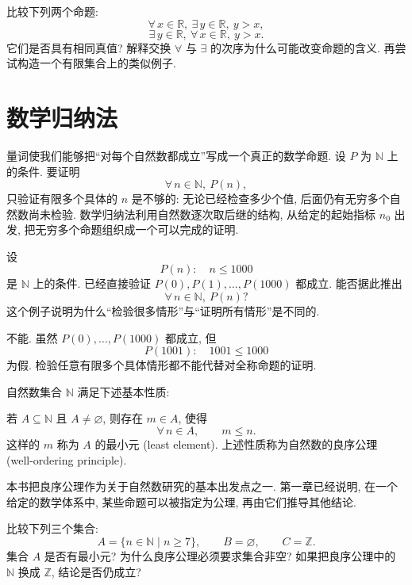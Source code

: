 \documentclass[usesamecnt, thmcnt=section, lang=cn, newtx, 10pt, scheme=chinese]{elegantbook}
\begin{document}
\begin{challenge}\label{ch:sets-03}
比较下列两个命题:
\[
 \forall\,x\in\mathbb R,\ \exists\,y\in\mathbb R,\ y>x,
\]
\[
 \exists\,y\in\mathbb R,\ \forall\,x\in\mathbb R,\ y>x.
\]
它们是否具有相同真值? 解释交换 $\forall$ 与 $\exists$ 的次序为什么可能改变命题的含义. 再尝试构造一个有限集合上的类似例子.
\end{challenge}


\section{数学归纳法}\label{sec:sets-induction}

量词使我们能够把``对每个自然数都成立''写成一个真正的数学命题. 设 $P$ 为 $\mathbb N$ 上的条件. 要证明
\[
 \forall\,n\in\mathbb N,\ P(n),
\]
只验证有限多个具体的 $n$ 是不够的: 无论已经检查多少个值, 后面仍有无穷多个自然数尚未检验. 数学归纳法利用自然数逐次取后继的结构, 从给定的起始指标 $n_0$ 出发, 把无穷多个命题组织成一个可以完成的证明.

\begin{concept}\label{con:sets-induction-finite}
设
\[
 P(n):\quad n\leq1000
\]
是 $\mathbb N$ 上的条件. 已经直接验证 $P(0),P(1),\ldots,P(1000)$ 都成立. 能否据此推出
\[
 \forall\,n\in\mathbb N,\ P(n)?
\]
这个例子说明为什么``检验很多情形''与``证明所有情形''是不同的.
\end{concept}

\begin{solution}
不能. 虽然 $P(0),\ldots,P(1000)$ 都成立, 但
\[
 P(1001):\quad 1001\leq1000
\]
为假. 检验任意有限多个具体情形都不能代替对全称命题的证明.
\end{solution}

\begin{axiom}[自然数的良序性]
自然数集合 $\mathbb N$ 满足下述基本性质:

若 $A\subseteq\mathbb N$ 且 $A\neq\varnothing$, 则存在 $m\in A$, 使得
\[
 \forall\,n\in A,\qquad m\leq n.
\]
这样的 $m$ 称为 $A$ 的{\color{blue}最小元 (least element)}. 上述性质称为自然数的{\color{blue}良序公理 (well-ordering principle)}.

本书把良序公理作为关于自然数研究的基本出发点之一. 第一章已经说明, 在一个给定的数学体系中, 某些命题可以被指定为公理, 再由它们推导其他结论.
\end{axiom}

\begin{concept}\label{con:sets-well-ordering}
比较下列三个集合:
\[
 A=\{n\in\mathbb N\mid n\geq7\},
 \qquad B=\varnothing,
 \qquad C=\mathbb Z.
\]
集合 $A$ 是否有最小元? 为什么良序公理必须要求集合非空? 如果把良序公理中的 $\mathbb N$ 换成 $\mathbb Z$, 结论是否仍成立?
\end{concept}
\end{document}
